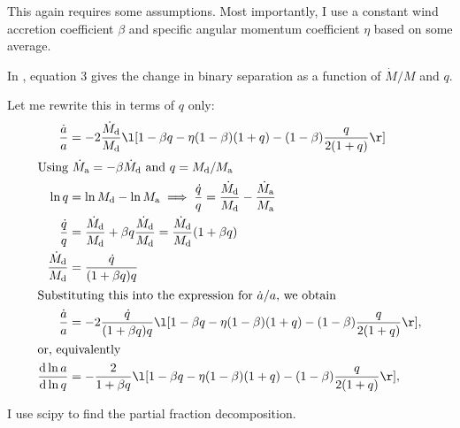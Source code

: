 \documentclass[a4paper,11pt]{article}
\begin{document}
This again requires some assumptions.
Most importantly, I use a constant wind accretion coefficient \(\beta \) and specific
angular momentum coefficient \(\eta \) based on some average.

In \citet{saladino2018}, equation 3 gives the change in binary separation as a function of \(\dot{M} /M \) and \(q\).

Let me rewrite this in terms of \(q\) only:
\begin{align*}
	\frac{\dot{a}}{a}                       & = -2 \frac{\dot{M}_\text{d} }{M_\text{d}} \l[1 - \beta q - \eta (1-\beta )(1+q) - (1-\beta ) \frac{q}{2(1+q)}\r]                          \\
	\intertext{Using \(\dot{M}_\text{a} = -\beta \dot{M}_\text{d}  \) and \(q = M_\text{d} / M_\text{a}\)}
	\ln q                                   & = \ln M_\text{d} - \ln M_\text{a} \implies \frac{\dot{q}}{q} =  \frac{\dot{M}_\text{d}}{M_\text{d}} - \frac{\dot{M}_\text{a}}{M_\text{a}} \\
	\frac{\dot{q}}{q}                       & = \frac{\dot{M}_\text{d}}{M_\text{d}} + \beta q\frac{\dot{M}_\text{d} }{M_\text{d}} = \frac{\dot{M}_\text{d}}{M_\text{d}}(1+\beta q)      \\
	\frac{\dot{M}_\text{d}}{M_\text{d}}     & = \frac{\dot{q}   }{(1+\beta q)q}                                                                                                         \\
	\intertext{Substituting this into the expression for \(\dot{a}  / a \), we obtain}
	\frac{\dot{a}}{a}                       & = -2 \frac{\dot{q}   }{(1+\beta q)q} \l[1 - \beta q - \eta (1-\beta )(1+q) - (1-\beta ) \frac{q}{2(1+q)}\r],                              \\
	\intertext{or, equivalently}
	\frac{\text{d} \ln a }{\text{d} \ln q } & =  -\frac{2}{1+\beta q} \l[1 - \beta q - \eta (1-\beta )(1+q) - (1-\beta ) \frac{q}{2(1+q)}\r],                                           \\
\end{align*}

I use scipy to find the partial fraction decomposition.
\end{document}
